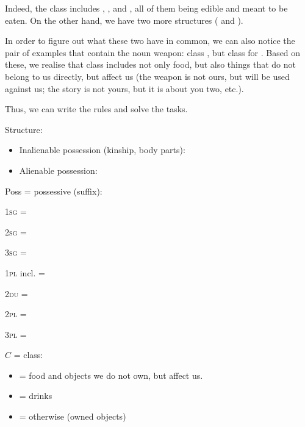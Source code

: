 \begin{refsection}
\begin{mysolution}
Indeed, the class  includes , , and , all of them being edible and meant to be eaten. On the other hand, we have two more structures ( and ).

In order to figure out what these two have in common, we can also notice the pair of examples that contain the noun weapon: class  , but class  for . Based on these, we realise that class  includes not only food, but also things that do not belong to us directly, but affect us (the weapon is not ours, but will be used against us; the story is not yours, but it is about you two, etc.).

Thus, we can write the rules and solve the tasks.


 Structure:

 \begin{itemize}

     \item Inalienable possession (kinship, body parts): 
     \item Alienable possession: 
 \end{itemize}


 Poss = possessive (suffix):

 \begin{itemize}
\begin{multicols}{4}
    \item[] 1\textsc{sg} = 
    \item[] 2\textsc{sg} = 
    \item[] 3\textsc{sg} = 
    \item[] 1\textsc{pl} incl. = 
    \item[] 2\textsc{du} = 
    \item[] 2\textsc{pl} = 
    \item[] 3\textsc{pl} = 
    \end{multicols}
\end{itemize}

 $C$ = class:

 \begin{itemize}

     \item {} = food and objects we do not own, but affect us.
     \item {} = drinks
     \item {} = otherwise (owned objects)
 \end{itemize}


\end{mysolution}
\end{refsection}

